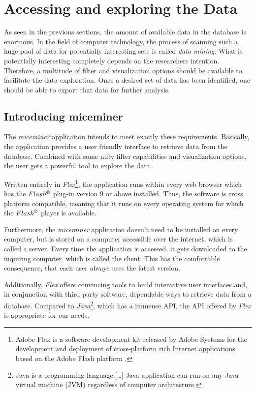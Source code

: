 \newpage
\section{Accessing and exploring the Data }
\label{sec:dataaccessandexp}

As seen in the previous sections, the amount of available data in the database is enormous. In the field of computer technology, the process of scanning such a huge pool of data for potentially interesting sets is called \textit{data mining}. What is potentially interesting completely depends on the researchers intention. Therefore, a multitude of filter and visualization options should be available to facilitate the data exploration. Once a desired set of data has been identified, one should be able to export that data for further analysis. 

\subsection{Introducing miceminer}
\label{subsec:dataexp}

The \textit{miceminer} application intends to meet exactly these requirements. Basically, the application provides a user friendly interface to retrieve data from the database. Combined with some nifty filter capabilities and visualization options, the user gets a powerful tool to explore the data.

Written entirely in \textit{Flex}\footnote{Adobe Flex is a software development kit released by Adobe Systems for the development and deployment of cross-platform rich Internet applications based on the Adobe Flash platform \cite{wiki:flex}.}, the application runs within every web browser which has the $Flash^{\copyright}$ plug-in version 9 or above installed. Thus, the software is cross platform compatible, meaning that it runs on every operating system for which the $Flash^{\copyright}$ player is available. 

Furthermore, the \textit{miceminer} application doesn't need to be installed on every computer, but is stored on a computer accessible over the internet, which is called a server. Every time the application is accessed, it gets downloaded to the inquiring computer, which is called the client. This has the comfortable consequence, that each user always uses the latest version.

Additionally, \textit{Flex} offers convincing tools to build interactive user interfaces and, in conjunction with third party software, dependable ways to retrieve data from a database. Compared to \textit{Java}\footnote{Java is a programming language.[\ldots] Java application can run on any Java virtual machine (JVM) regardless of computer architecture\cite{wiki:java}.}, which has a immense \ac{API}, the \ac{API} offered by \textit{Flex} is appropriate for our needs.


